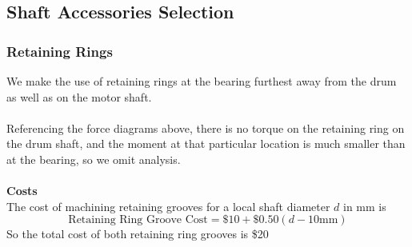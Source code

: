 \documentclass[letterpaper,12pt]{article}
\begin{document}
\subsection{Shaft Accessories Selection}

\subsubsection{Retaining Rings}
We make the use of retaining rings at the bearing furthest away from the drum as well as on the motor shaft.
\\\\
Referencing the force diagrams above, there is no torque on the retaining ring on the drum shaft, and the moment at that particular location is much smaller than at the bearing, so we omit analysis. 
\\\\
\textbf{Costs}
\\
The cost of machining retaining grooves for a local shaft diameter $d$ in mm is
\begin{equation}
    \text{Retaining Ring Groove Cost} = \$10 + \$0.50(d - 10\text{mm})
\end{equation}
So the total cost of both retaining ring grooves is \$20
\end{document}

